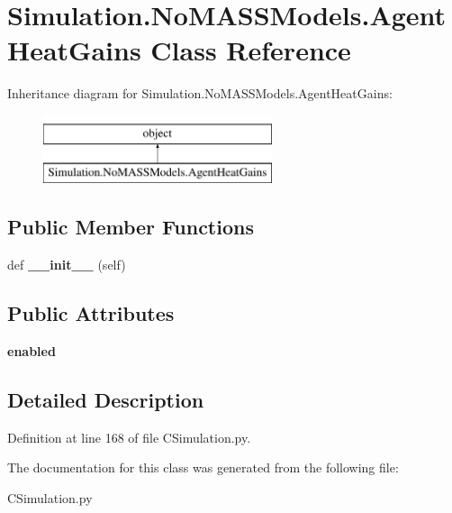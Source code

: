 \hypertarget{class_c_simulation_1_1_simulation_1_1_no_m_a_s_s_models_1_1_agent_heat_gains}{}\section{Simulation.\+No\+M\+A\+S\+S\+Models.\+Agent\+Heat\+Gains Class Reference}
\label{class_c_simulation_1_1_simulation_1_1_no_m_a_s_s_models_1_1_agent_heat_gains}
Inheritance diagram for Simulation.\+No\+M\+A\+S\+S\+Models.\+Agent\+Heat\+Gains\+:\begin{figure}[H]
\begin{center}
\leavevmode
\includegraphics[height=2.000000cm]{class_c_simulation_1_1_simulation_1_1_no_m_a_s_s_models_1_1_agent_heat_gains}
\end{center}
\end{figure}
\subsection*{Public Member Functions}
\begin{DoxyCompactItemize}
\item 
\mbox{\label{class_c_simulation_1_1_simulation_1_1_no_m_a_s_s_models_1_1_agent_heat_gains_ae64f0875afe3067b97ba370b354b9213}} 
def {\bfseries \+\_\+\+\_\+init\+\_\+\+\_\+} (self)
\end{DoxyCompactItemize}
\subsection*{Public Attributes}
\begin{DoxyCompactItemize}
\item 
\mbox{\label{class_c_simulation_1_1_simulation_1_1_no_m_a_s_s_models_1_1_agent_heat_gains_a91b39549c797bd5646357c8b6eecad0f}} 
{\bfseries enabled}
\end{DoxyCompactItemize}


\subsection{Detailed Description}


Definition at line 168 of file C\+Simulation.\+py.



The documentation for this class was generated from the following file\+:\begin{DoxyCompactItemize}
\item 
C\+Simulation.\+py\end{DoxyCompactItemize}
